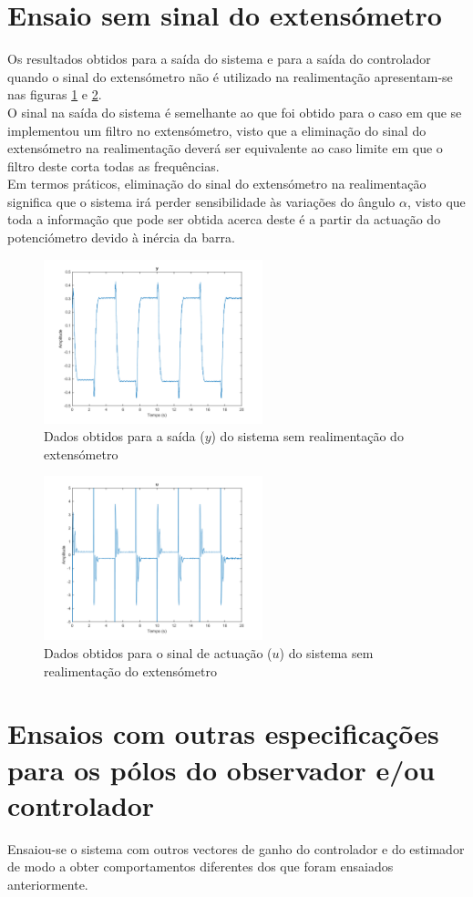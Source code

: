 \documentclass[%
  reprint,
  nofootinbib,
  amsmath,amssymb,
  aps,
  10pt,
  a4paper
]{revtex4-1}
\begin{document}
\section{Ensaio sem sinal do extensómetro}
Os resultados obtidos para a saída do sistema e para a saída do controlador quando o sinal do extensómetro não é utilizado na realimentação apresentam-se nas figuras \ref{fig:y_next} e \ref{fig:u_next}.\\
O sinal na saída do sistema é semelhante ao que foi obtido para o caso em que se implementou um filtro no extensómetro, visto que a eliminação do sinal do extensómetro na realimentação deverá ser equivalente ao caso limite em que o filtro deste corta todas as frequências.\\
Em termos práticos, eliminação do sinal do extensómetro na realimentação significa que o sistema irá perder sensibilidade às variações do ângulo $\alpha$, visto que toda a informação que pode ser obtida acerca deste é a partir da actuação do potenciómetro devido à inércia da barra.
\begin{figure}
\includegraphics[width=2.5in]{../imgs/dados_0n/dados_0n_y.png}
\caption{Dados obtidos para a saída ($y$) do sistema sem realimentação do extensómetro}
\label{fig:y_next}
\end{figure}
\begin{figure}
\includegraphics[width=2.5in]{../imgs/dados_0n/dados_0n_u.png}
\caption{Dados obtidos para o sinal de actuação ($u$) do sistema sem realimentação do extensómetro}
\label{fig:u_next}
\end{figure}
\section{Ensaios com outras especificações para os pólos do observador e/ou controlador}
Ensaiou-se o sistema com outros vectores de ganho do controlador e do estimador de modo a obter comportamentos diferentes dos que foram ensaiados anteriormente.\\
\end{document}

